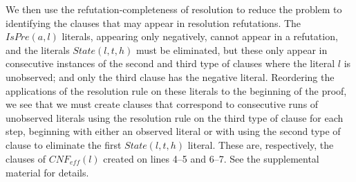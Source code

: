 \documentclass[letterpaper]{article} %
\newcommand{\eff}{\textit{eff}}
\newcommand{\ispre}{\textit{IsPre}}
\begin{document}
We then use the refutation-completeness of resolution to reduce the problem to identifying the clauses that may appear in resolution refutations. The $\ispre(a,l)$ literals, appearing only negatively, cannot appear in a refutation, and the literals $State(l,t,h)$ must be eliminated, but these only appear in consecutive instances of the second and third type of clauses where the literal $l$ is unobserved; and only the third clause has the negative literal. Reordering the applications of the resolution rule on these literals to the beginning of the proof, we see that we must create clauses that correspond to consecutive runs of unobserved literals using the resolution rule on the third type of clause for each step, beginning with either an observed literal or with using the second type of clause to eliminate the first $State(l,t,h)$ literal. These are, respectively, the clauses of $CNF_{\eff}(l)$ created on lines 4--5 and 6--7. See the supplemental material for details.
\end{document}
